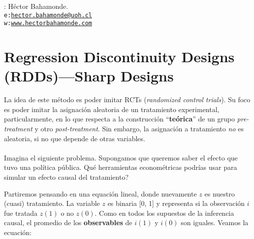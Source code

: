 \documentclass[10pt]{article}
\begin{document}


\thispagestyle{fancy} %





\hspace{-5mm}{\bf Profesor}: H\'ector Bahamonde.\\
\texttt{e:}\href{mailto:hector.bahamonde@uoh.cl}{\texttt{hector.bahamonde@uoh.cl}}\\
\texttt{w:}\href{http://www.hectorbahamonde.com}{\texttt{www.hectorbahamonde.com}}

\section*{Regression Discontinuity Designs (RDDs)---Sharp Designs}

La idea de este m\'etodo es poder imitar RCTs (\emph{randomized control trials}). Su foco es poder imitar la asignaci\'on aleatoria de un tratamiento experimental, particularmente, en lo que respecta a la construcci\'on ``{\bf te\'orica}'' de un grupo \emph{pre-treatment} y otro \emph{post-treatment}. Sin embargo, la asignaci\'on a tratamiento \emph{no} es aleatoria, si no que depende de otras variables.
\\
\\
Imagina el siguiente problema. Supongamos que queremos saber el efecto que tuvo una pol\'itica p\'ublica. Qu\'e herramientas econom\'etricas podr\'ias usar para simular un efecto causal del tratamiento?

Partiremos pensando en una equaci\'on lineal, donde nuevamente $z$ es nuestro (cuasi) tratamiento. La variable $z$ es binaria [0, 1] y representa si la observaci\'on $i$ fue tratada $z(1)$ o no $z(0)$. Como en todos los supuestos de la inferencia causal, el promedio de los {\bf observables} de $i(1)$ y $i(0)$ son iguales. Veamos la ecuaci\'on:
\end{document}
